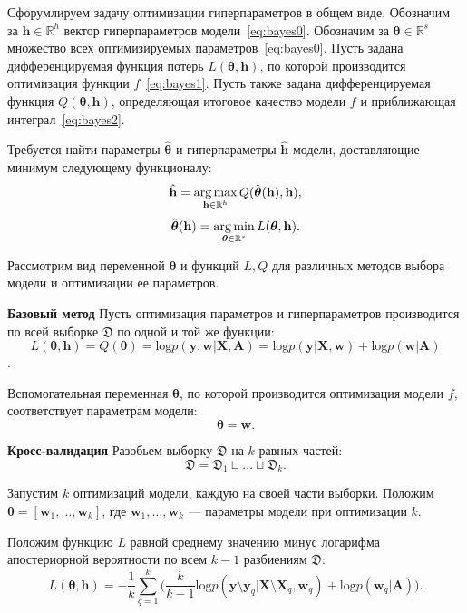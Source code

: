 Сфорумлируем задачу оптимизации гиперпараметров в общем виде. Обозначим за $\mathbf{h}  \in \mathbb{R}^h$ вектор гиперпараметров модели~\eqref{eq:bayes0}.   Обозначим за $\boldsymbol{\theta} \in \mathbb{R}^s$ множество всех оптимизируемых параметров~\eqref{eq:bayes0}. Пусть задана дифференцируемая функция потерь $L(\boldsymbol{\theta}, \mathbf{h})$, по которой производится оптимизация функции ${f}$~\eqref{eq:bayes1}. 
Пусть также задана дифференцируемая функция $Q(\boldsymbol{\theta}, \mathbf{h})$, определяющая итоговое качество модели ${f}$ и приближающая интеграл~\eqref{eq:bayes2}.

Требуется найти параметры $\hat{\boldsymbol{\theta}}$ и гиперпараметры $\hat{\mathbf{h}}$ модели, доставляющие минимум следующему функционалу:
\begin{equation}
\label{eq:main}
	\hat{\mathbf{h}} = \operatorname*{arg\,max}_{\mathbf{h} \in \mathbb{R}^h} Q(\hat{\boldsymbol{\theta}}(\mathbf{h}), \mathbf{h}),
\end{equation}
\begin{equation}
\label{eq:main2}
	\hat{\boldsymbol{\theta}}(\mathbf{h}) =  \operatorname*{arg\,min}_{\boldsymbol{\theta} \in \mathbb{R}^s} L(\boldsymbol{\theta}, \mathbf{h}).
\end{equation}

Рассмотрим вид переменной $\boldsymbol{\theta}$ и функций $L, Q$ для различных методов выбора модели и оптимизации ее параметров.

\textbf{Базовый метод}
Пусть оптимизация параметров и гиперпараметров производится по всей выборке $\mathfrak{D}$ по одной и той же функции:
$$L(\boldsymbol{\theta}, \mathbf{h}) = Q(\boldsymbol{\theta}) = \text{log}p(\mathbf{y}, \mathbf{w} | \mathbf{X}, \mathbf{A}) = \text{log} p(\mathbf{y}|\mathbf{X}, \mathbf{w})+\text{log}p(\mathbf{w}|\mathbf{A})$$.

Вспомогательная переменная $\boldsymbol{\theta}$, по которой производится оптимизация модели $f$,  соответствует параметрам модели: 
\[
\boldsymbol{\theta} = \mathbf{w}.
\]

\textbf{Кросс-валидация}
Разобьем выборку $\mathfrak{D}$ на $k$ равных частей:
\[
\mathfrak{D} = \mathfrak{D}_1 \sqcup \dots \sqcup \mathfrak{D}_k.
\]


Запустим $k$ оптимизаций модели, каждую на своей части выборки. Положим $\boldsymbol{\theta} = [\mathbf{w}_1, \dots, \mathbf{w}_k]$, где $\mathbf{w}_1, \dots, \mathbf{w}_k$ --- параметры модели при оптимизации $k$.
 
Положим функцию $L$ равной  среднему значению минус логарифма апостериорной вероятности по всем $k-1$ разбиениям $\mathfrak{D}$:
\begin{equation}
\label{eq:cv}
L(\boldsymbol{\theta}, \mathbf{h}) = -\frac{1}{k}\sum_{q=1}^k \bigl(\frac{k}{k-1}\text{log}p(\mathbf{y} \setminus \mathbf{y}_q|\mathbf{X}\setminus \mathbf{X}_q, \mathbf{w}_q) + \text{log}p(\mathbf{w}_q|\mathbf{A})\bigr).
\end{equation}

